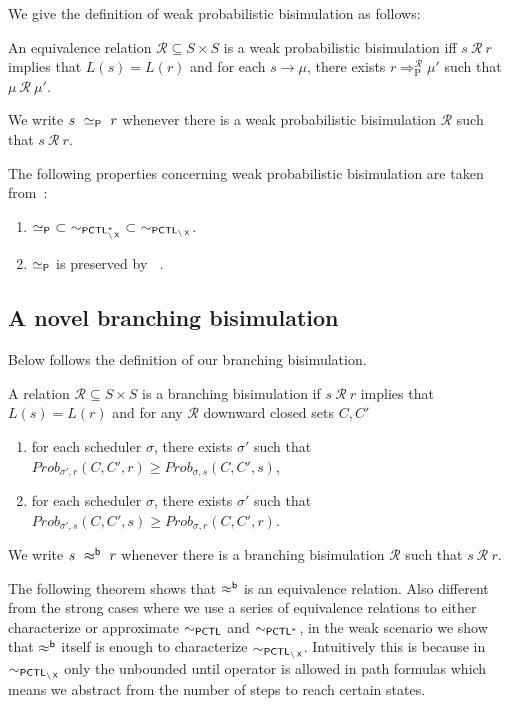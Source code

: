 \documentclass{LMCS}
\DeclareMathOperator{\interleave}{||}
\DeclareMathOperator{\X}{\text{\sf X}}
\newcommand{\TRAN}[2]{#1\rightarrow #2}
\newcommand{\PCTL}{{\sf PCTL}}
\newcommand{\EPCTL}{\sim_{\PCTL}}
\newcommand{\EPCTLS}{\sim_{\PCTL^{*}}}
\newcommand{\bBSP}{\simeq_{{\sf P}}}
\newcommand{\MC}[1]{\mathcal{#1}}
\newcommand{\EPCTLWN}{\sim_{\PCTL_{\backslash\X}}}
\newcommand{\EPCTLSWN}{\sim_{\PCTL^{*}_{\backslash\X}}}
\newcommand{\WBSB}{\approx^{{\sf b}}}
\newcommand{\bTRANP}[2]{#1\Rightarrow^{\MC{R}}_{\text{P}}#2}
\newcommand{\MEASURE}{\mathit{Prob}}
\begin{document}
We give the definition of weak probabilistic bisimulation as follows:
\begin{defi}\label{def:branching bisimulation}
An equivalence relation $\MC{R}\subseteq S\times S$ is a weak probabilistic bisimulation iff $s~\MC{R}~r$ implies that $L(s)=L(r)$ and for each $\TRAN{s}{\mu}$, there exists $\bTRANP{r}{\mu'}$ such that $\mu~\MC{R}~\mu'$.

We write $s~\bBSP~r$ whenever there is a weak probabilistic bisimulation $\MC{R}$ such that $s~\MC{R}~r$.
\end{defi}

The following properties concerning weak probabilistic bisimulation are taken from~\cite{SegalaL95}:
\begin{lem}\label{thm:branching and branching probabilistic}\hfill
\begin{enumerate}[\em(1)]
\item $\bBSP~\subset~\EPCTLSWN~\subset~\EPCTLWN$.
\item $\bBSP$ is preserved by $\interleave$.
\end{enumerate}
\end{lem}


\subsection{A novel branching bisimulation}\label{sec:weak bisimulation branching}
Below follows the definition of our branching bisimulation.
\begin{defi}\label{def:weak bisimulation branching}
A relation $\MC{R}\subseteq S\times S$ is a branching bisimulation if $s~\MC{R}~r$ implies that $L(s)=L(r)$ and for any $\MC{R}$ downward closed sets $C,C'$
\begin{enumerate}[(1)]
\item for each scheduler $\sigma$, there exists $\sigma'$ such that $\MEASURE_{\sigma',r}(C,C',r)\geq\MEASURE_{\sigma,s}(C,C',s)$,
\item for each scheduler $\sigma$, there exists $\sigma'$ such that $\MEASURE_{\sigma',s}(C,C',s)\geq\MEASURE_{\sigma,r}(C,C',r)$.
\end{enumerate}

\noindent We write $s~\WBSB~r$ whenever there is a branching bisimulation $\MC{R}$ such that $s~\MC{R}~r$.
\end{defi}

The following theorem shows that $\WBSB$ is an equivalence relation. Also different from the strong cases where we use a series of equivalence relations to either characterize or approximate $\EPCTL$ and $\EPCTLS$, in the weak scenario we show that $\WBSB$ itself is enough to characterize $\EPCTLWN$. Intuitively this is because in $\EPCTLWN$ only the unbounded until operator is allowed in path formulas which means we abstract from the number of steps to reach certain states.
\end{document}
